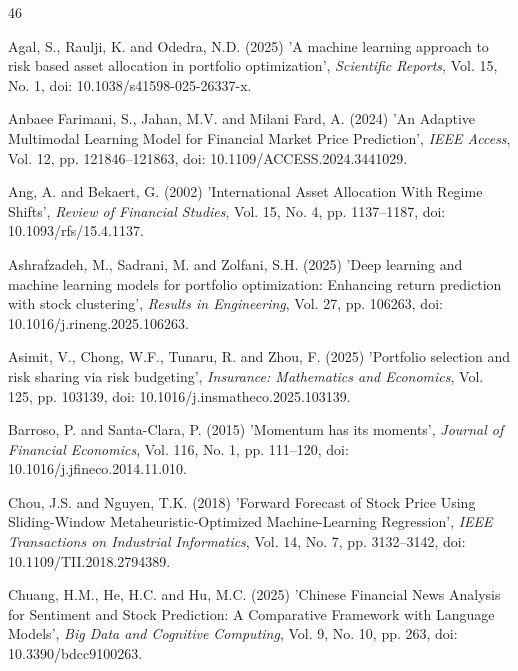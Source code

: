 \documentclass{singlecol-new}
\theoremstyle{TH}{
\newtheorem{lemma}{Lemma}
\newtheorem{theorem}[lemma]{Theorem}
\newtheorem{corrolary}[lemma]{Corrolary}
\newtheorem{conjecture}[lemma]{Conjecture}
\newtheorem{proposition}[lemma]{Proposition}
\newtheorem{claim}[lemma]{Claim}
\newtheorem{stheorem}[lemma]{Wrong Theorem}
\newtheorem{algorithm}{Algorithm}
}
\theoremstyle{THrm}{
\newtheorem{definition}{Definition}[section]
\newtheorem{question}{Question}[section]
\newtheorem{remark}{Remark}
\newtheorem{scheme}{Scheme}
}
\theoremstyle{THhit}{
\newtheorem{case}{Case}[section]
}
\begin{document}
\label{sec:refs}
\begin{thebibliography}{46}

Agal, S., Raulji, K. and Odedra, N.D. (2025) 'A machine learning approach to risk based asset allocation in portfolio optimization', {\it Scientific Reports}, Vol. 15, No. 1, doi: 10.1038/s41598-025-26337-x.

Anbaee Farimani, S., Jahan, M.V. and Milani Fard, A. (2024) 'An Adaptive Multimodal Learning Model for Financial Market Price Prediction', {\it IEEE Access}, Vol. 12, pp. 121846--121863, doi: 10.1109/ACCESS.2024.3441029.

Ang, A. and Bekaert, G. (2002) 'International Asset Allocation With Regime Shifts', {\it Review of Financial Studies}, Vol. 15, No. 4, pp. 1137--1187, doi: 10.1093/rfs/15.4.1137.

Ashrafzadeh, M., Sadrani, M. and Zolfani, S.H. (2025) 'Deep learning and machine learning models for portfolio optimization: Enhancing return prediction with stock clustering', {\it Results in Engineering}, Vol. 27, pp. 106263, doi: 10.1016/j.rineng.2025.106263.

Asimit, V., Chong, W.F., Tunaru, R. and Zhou, F. (2025) 'Portfolio selection and risk sharing via risk budgeting', {\it Insurance: Mathematics and Economics}, Vol. 125, pp. 103139, doi: 10.1016/j.insmatheco.2025.103139.

Barroso, P. and Santa-Clara, P. (2015) 'Momentum has its moments', {\it Journal of Financial Economics}, Vol. 116, No. 1, pp. 111--120, doi: 10.1016/j.jfineco.2014.11.010.

Chou, J.S. and Nguyen, T.K. (2018) 'Forward Forecast of Stock Price Using Sliding-Window Metaheuristic-Optimized Machine-Learning Regression', {\it IEEE Transactions on Industrial Informatics}, Vol. 14, No. 7, pp. 3132--3142, doi: 10.1109/TII.2018.2794389.

Chuang, H.M., He, H.C. and Hu, M.C. (2025) 'Chinese Financial News Analysis for Sentiment and Stock Prediction: A Comparative Framework with Language Models', {\it Big Data and Cognitive Computing}, Vol. 9, No. 10, pp. 263, doi: 10.3390/bdcc9100263.


\end{thebibliography}
\end{document}
